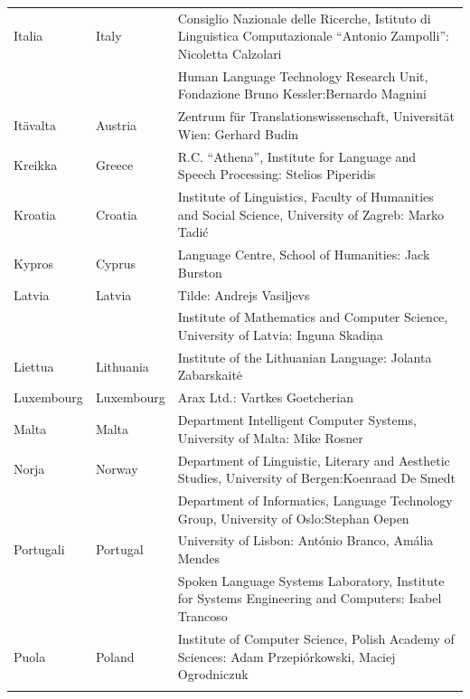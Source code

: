 \begin{longtable}{@{}llp{113mm}@{}}
Italia & \textcolor{grey1}{Italy} & Consiglio Nazionale delle Ricerche, Istituto di Linguistica Computazionale ``Antonio Zampolli'': Nicoletta Calzolari\\ \addlinespace
  & & Human Language Technology Research Unit, Fondazione Bruno Kessler:\newline Bernardo Magnini\\ \addlinespace 
Itävalta & \textcolor{grey1}{Austria} & Zentrum für Translationswissenschaft, Universität Wien: Gerhard Budin\\ \addlinespace 
Kreikka & \textcolor{grey1}{Greece} & R.C. ``Athena'', Institute for Language and Speech Processing: Stelios Piperidis\\ \addlinespace
Kroatia & \textcolor{grey1}{Croatia} & Institute of Linguistics, Faculty of Humanities and Social Science, University of Zagreb: Marko Tadić \\ \addlinespace
Kypros & \textcolor{grey1}{Cyprus} & Language Centre, School of Humanities: Jack Burston\\ \addlinespace
Latvia & \textcolor{grey1}{Latvia} & Tilde: Andrejs Vasiļjevs\\ \addlinespace 
  & & Institute of Mathematics and Computer Science, University of Latvia: Inguna Skadiņa\\ \addlinespace
Liettua & \textcolor{grey1}{Lithuania} & Institute of the Lithuanian Language: Jolanta Zabarskaitė\\ \addlinespace
Luxembourg & \textcolor{grey1}{Luxembourg} & Arax Ltd.: Vartkes Goetcherian\\ \addlinespace
Malta & \textcolor{grey1}{Malta} & Department Intelligent Computer Systems, University of Malta: Mike Rosner\\ \addlinespace
Norja & \textcolor{grey1}{Norway} & Department of Linguistic, Literary and Aesthetic Studies, University of Bergen:\newline Koenraad De Smedt\\ \addlinespace 
  & & Department of Informatics, Language Technology Group, University of Oslo:\newline Stephan Oepen \\ \addlinespace
Portugali & \textcolor{grey1}{Portugal} & University of Lisbon: António Branco, Amália Mendes \\ \addlinespace
  & & Spoken Language Systems Laboratory, Institute for Systems Engineering and Computers: Isabel Trancoso \\ \addlinespace
Puola & \textcolor{grey1}{Poland} & Institute of Computer Science, Polish Academy of Sciences: Adam Przepiórkowski, Maciej Ogrodniczuk \\ \addlinespace

\end{longtable}
